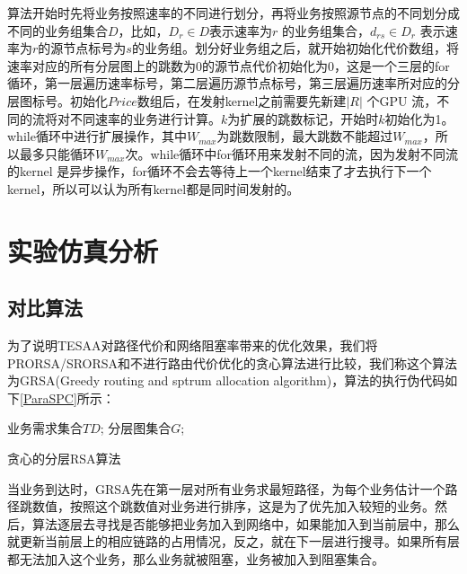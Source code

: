 算法开始时先将业务按照速率的不同进行划分，再将业务按照源节点的不同划分成不同的业务组集合$D$，比如，$D_r \in D$表示速率为$r$ 的业务组集合，$d_{rs} \in D_r$ 表示速率为$r$的源节点标号为$s$的业务组。划分好业务组之后，就开始初始化代价数组，将速率对应的所有分层图上的跳数为0的源节点代价初始化为0，这是一个三层的for循环，第一层遍历速率标号，第二层遍历源节点标号，第三层遍历速率所对应的分层图标号。初始化$Price$数组后，在发射kernel之前需要先新建$|R|$ 个GPU 流，不同的流将对不同速率的业务进行计算。$k$为扩展的跳数标记，开始时$k$初始化为1。while循环中进行扩展操作，其中$W_{max}$为跳数限制，最大跳数不能超过$W_{max}$，所以最多只能循环$W_{max}$次。while循环中for循环用来发射不同的流，因为发射不同流的kernel 是异步操作，for循环不会去等待上一个kernel结束了才去执行下一个kernel，所以可以认为所有kernel都是同时间发射的。
\section{实验仿真分析}
\subsection{对比算法}
为了说明TESAA对路径代价和网络阻塞率带来的优化效果，我们将PRORSA/SRORSA和不进行路由代价优化的贪心算法进行比较，我们称这个算法为GRSA(Greedy routing and sptrum allocation algorithm)，算法的执行伪代码如下\ref{ParaSPC}所示：
\begin{algorithm}[t]
\begin{algorithmic}[1]
\Require
业务需求集合$TD$;
分层图集合$G$;
\EndIf
\EndFor
{}
\EndIf
\EndFor
\EndFor
\EndFor
\end{algorithmic}
\caption{{贪心的分层RSA算法}}
\label{ParaSPC}
\end{algorithm}

当业务到达时，GRSA先在第一层对所有业务求最短路径，为每个业务估计一个路径跳数值，按照这个跳数值对业务进行排序，这是为了优先加入较短的业务。然后，算法逐层去寻找是否能够把业务加入到网络中，如果能加入到当前层中，那么就更新当前层上的相应链路的占用情况，反之，就在下一层进行搜寻。如果所有层都无法加入这个业务，那么业务就被阻塞，业务被加入到阻塞集合。

